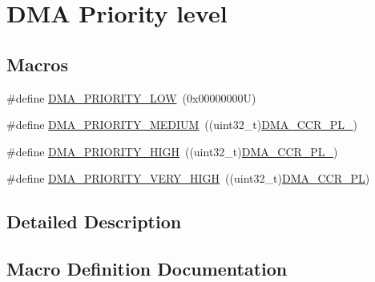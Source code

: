 \hypertarget{group___d_m_a___priority__level}{}\section{D\+MA Priority level}
\label{group___d_m_a___priority__level}
\subsection*{Macros}
\begin{DoxyCompactItemize}
\item 
\#define \hyperlink{group___d_m_a___priority__level_ga0d1ed2bc9229ba3c953002bcf3a72130}{D\+M\+A\+\_\+\+P\+R\+I\+O\+R\+I\+T\+Y\+\_\+\+L\+OW}~(0x00000000\+U)
\item 
\#define \hyperlink{group___d_m_a___priority__level_gad6fbeee76fd4a02cbed64365bb4c1781}{D\+M\+A\+\_\+\+P\+R\+I\+O\+R\+I\+T\+Y\+\_\+\+M\+E\+D\+I\+UM}~((uint32\+\_\+t)\hyperlink{group___peripheral___registers___bits___definition_gaa935d7f115297c5e9e10a62efd065247}{D\+M\+A\+\_\+\+C\+C\+R\+\_\+\+P\+L\+\_})
\item 
\#define \hyperlink{group___d_m_a___priority__level_ga6b2f5c5e22895f8b4bd52a27ec6cae2a}{D\+M\+A\+\_\+\+P\+R\+I\+O\+R\+I\+T\+Y\+\_\+\+H\+I\+GH}~((uint32\+\_\+t)\hyperlink{group___peripheral___registers___bits___definition_ga82819927445c9617409bb08e09dc4cd8}{D\+M\+A\+\_\+\+C\+C\+R\+\_\+\+P\+L\+\_})
\item 
\#define \hyperlink{group___d_m_a___priority__level_gaed0542331a4d875d1d8d5b2878e9372c}{D\+M\+A\+\_\+\+P\+R\+I\+O\+R\+I\+T\+Y\+\_\+\+V\+E\+R\+Y\+\_\+\+H\+I\+GH}~((uint32\+\_\+t)\hyperlink{group___peripheral___registers___bits___definition_ga97726688157629243aa59bb60e33c284}{D\+M\+A\+\_\+\+C\+C\+R\+\_\+\+PL})
\end{DoxyCompactItemize}


\subsection{Detailed Description}


\subsection{Macro Definition Documentation}
\mbox{\label{group___d_m_a___priority__level_ga6b2f5c5e22895f8b4bd52a27ec6cae2a}} 
